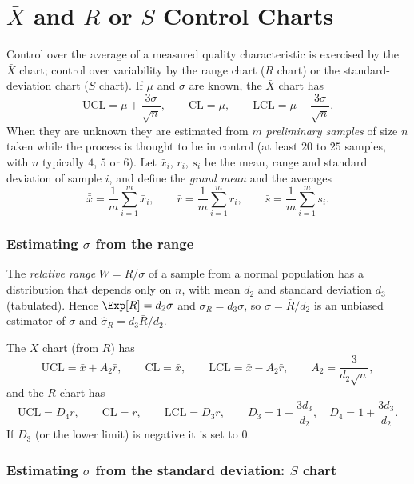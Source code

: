 \section{$\bar{X}$ and $R$ or $S$ Control Charts}

Control over the average of a measured quality characteristic is exercised by the $\bar{X}$ chart; control over variability by the range chart ($R$ chart) or the standard-deviation chart ($S$ chart). If $\mu$ and $\sigma$ are known, the $\bar{X}$ chart has
\[ \mathrm{UCL}=\mu+\frac{3\sigma}{\sqrt n},\qquad\mathrm{CL}=\mu,\qquad\mathrm{LCL}=\mu-\frac{3\sigma}{\sqrt n}. \]
When they are unknown they are estimated from $m$ \emph{preliminary samples} of size $n$ taken while the process is thought to be in control (at least $20$ to $25$ samples, with $n$ typically $4$, $5$ or $6$). Let $\bar{x}_i$, $r_i$, $s_i$ be the mean, range and standard deviation of sample $i$, and define the \emph{grand mean} and the averages
\[ \bar{\bar{x}}=\frac1m\sum_{i=1}^m\bar{x}_i,\qquad\bar{r}=\frac1m\sum_{i=1}^mr_i,\qquad\bar{s}=\frac1m\sum_{i=1}^ms_i. \]

\subsubsection*{Estimating $\sigma$ from the range}

The \emph{relative range} $W=R/\sigma$ of a sample from a normal population has a distribution that depends only on $n$, with mean $d_2$ and standard deviation $d_3$ (tabulated). Hence $\Exp[R]=d_2\sigma$ and $\sigma_R=d_3\sigma$, so $\hat\sigma=\bar{R}/d_2$ is an unbiased estimator of $\sigma$ and $\hat\sigma_R=d_3\bar{R}/d_2$.

\begin{theorem}\label{thm:xbarR}
The $\bar{X}$ chart (from $\bar{R}$) has
\[ \mathrm{UCL}=\bar{\bar{x}}+A_2\bar{r},\qquad\mathrm{CL}=\bar{\bar{x}},\qquad\mathrm{LCL}=\bar{\bar{x}}-A_2\bar{r},\qquad A_2=\frac3{d_2\sqrt n}, \]
and the $R$ chart has
\[ \mathrm{UCL}=D_4\bar{r},\qquad\mathrm{CL}=\bar{r},\qquad\mathrm{LCL}=D_3\bar{r},\qquad D_3=1-\frac{3d_3}{d_2},\quad D_4=1+\frac{3d_3}{d_2}. \]
If $D_3$ (or the lower limit) is negative it is set to $0$.
\end{theorem}

\subsubsection*{Estimating $\sigma$ from the standard deviation: $S$ chart}

